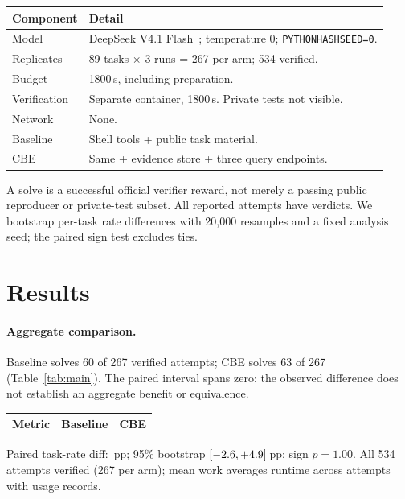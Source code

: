\documentclass[11pt,a4paper,twocolumn]{article}
\newcommand{\smalltable}{\fontsize{8.7}{10.7}\selectfont\setlength{\tabcolsep}{3pt}\renewcommand{\arraystretch}{1.12}}
\begin{document}
\begin{minipage}{\columnwidth}
\label{tab:setup}
\smalltable
\begin{tabularx}{\columnwidth}{@{}p{1.65cm}X@{}}
\toprule
Component & Detail \\
\midrule
Model & DeepSeek V4.1 Flash~\citep{deepseek2026}; temperature 0; \texttt{PYTHONHASHSEED=0}. \\
Replicates & 89 tasks $\times$ 3 runs = 267 per arm; 534 verified. \\
Budget & 1800\,s, including preparation. \\
Verification & Separate container, 1800\,s. Private tests not visible. \\
Network & None. \\
Baseline & Shell tools + public task material. \\
CBE & Same + evidence store + three query endpoints. \\
\bottomrule
\end{tabularx}
\end{minipage}

A solve is a successful official verifier reward, not merely a passing public reproducer or private-test subset. All reported attempts have verdicts. We bootstrap per-task rate differences with 20,000 resamples and a fixed analysis seed; the paired sign test excludes ties.

\section{Results}
\label{sec:results}

\paragraph{Aggregate comparison.}
Baseline solves 60 of 267 verified attempts; CBE solves 63 of 267 (Table~\ref{tab:main}). The paired interval spans zero: the observed difference does not establish an aggregate benefit or equivalence.

\begin{minipage}{\columnwidth}
\label{tab:main}
\smalltable
\begin{tabular*}{\columnwidth}{@{\extracolsep{\fill}}lrr@{}}
\toprule
Metric & Baseline & CBE \\
\midrule

\end{tabular*}
\vspace{3pt}
{\fontsize{8.2}{9.8}\selectfont
Paired task-rate diff: \TaskDelta{}\,pp; 95\% bootstrap $[-2.6,+4.9]$\,pp; sign $p=1.00$. All 534 attempts verified (267 per arm); mean work averages runtime across attempts with usage records.}
\end{minipage}
\end{document}
